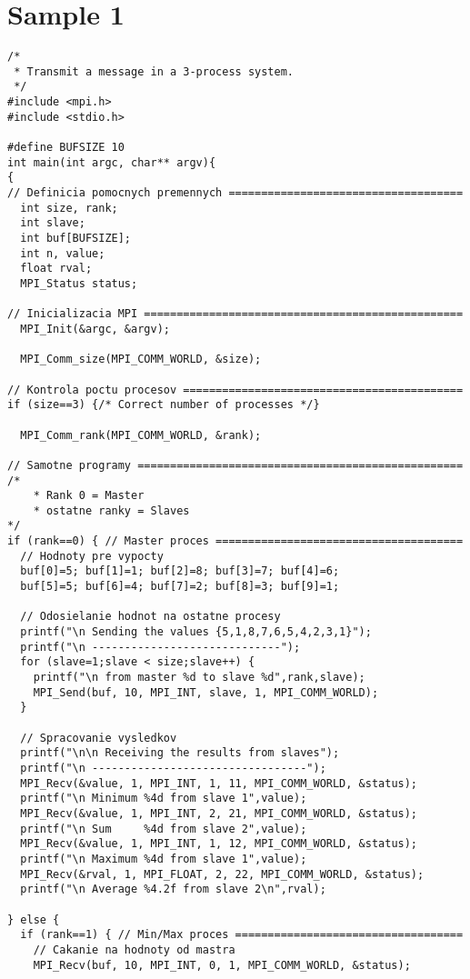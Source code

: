 \documentclass{report}
\begin{document}
\section{Sample 1}
\begin{lstlisting}
/* 
 * Transmit a message in a 3-process system. 
 */ 
#include <mpi.h>
#include <stdio.h>

#define BUFSIZE 10
int main(int argc, char** argv){
{ 
// Definicia pomocnych premennych ====================================
  int size, rank;
  int slave;
  int buf[BUFSIZE];
  int n, value;
  float rval;
  MPI_Status status;

// Inicializacia MPI =================================================
  MPI_Init(&argc, &argv);

  MPI_Comm_size(MPI_COMM_WORLD, &size);

// Kontrola poctu procesov ===========================================
if (size==3) {/* Correct number of processes */}

  MPI_Comm_rank(MPI_COMM_WORLD, &rank); 

// Samotne programy ==================================================
/*
	* Rank 0 = Master
	* ostatne ranky = Slaves
*/
if (rank==0) { // Master proces ======================================
  // Hodnoty pre vypocty
  buf[0]=5; buf[1]=1; buf[2]=8; buf[3]=7; buf[4]=6; 
  buf[5]=5; buf[6]=4; buf[7]=2; buf[8]=3; buf[9]=1;

  // Odosielanie hodnot na ostatne procesy
  printf("\n Sending the values {5,1,8,7,6,5,4,2,3,1}"); 
  printf("\n -----------------------------"); 
  for (slave=1;slave < size;slave++) {
    printf("\n from master %d to slave %d",rank,slave); 
    MPI_Send(buf, 10, MPI_INT, slave, 1, MPI_COMM_WORLD);
  }

  // Spracovanie vysledkov
  printf("\n\n Receiving the results from slaves"); 
  printf("\n ---------------------------------"); 
  MPI_Recv(&value, 1, MPI_INT, 1, 11, MPI_COMM_WORLD, &status);
  printf("\n Minimum %4d from slave 1",value); 
  MPI_Recv(&value, 1, MPI_INT, 2, 21, MPI_COMM_WORLD, &status);
  printf("\n Sum     %4d from slave 2",value); 
  MPI_Recv(&value, 1, MPI_INT, 1, 12, MPI_COMM_WORLD, &status);
  printf("\n Maximum %4d from slave 1",value); 
  MPI_Recv(&rval, 1, MPI_FLOAT, 2, 22, MPI_COMM_WORLD, &status);
  printf("\n Average %4.2f from slave 2\n",rval); 

} else {
  if (rank==1) { // Min/Max proces ===================================
	// Cakanie na hodnoty od mastra
    MPI_Recv(buf, 10, MPI_INT, 0, 1, MPI_COMM_WORLD, &status);


\end{lstlisting}
\end{document}
